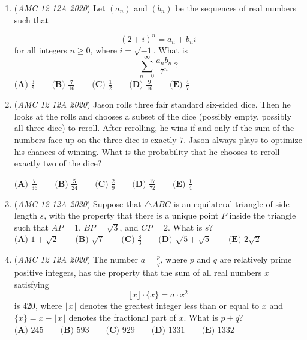 \begin{enumerate}
	\item (\textit{AMC 12 12A 2020}) Let $(a_n)$ and $(b_n)$ be the sequences of real numbers such that

 \[ (2 + i)^n = a_n + b_ni \]for all integers $n\geq 0$, where $i = \sqrt{-1}$. What is
 \[\sum_{n=0}^\infty\frac{a_nb_n}{7^n}\,?\]
$\textbf{(A) }\frac 38\qquad\textbf{(B) }\frac7{16}\qquad\textbf{(C) }\frac12\qquad\textbf{(D) }\frac9{16}\qquad\textbf{(E) }\frac47$


	\item (\textit{AMC 12 12A 2020}) Jason rolls three fair standard six-sided dice. Then he looks at the rolls and chooses a subset of the dice (possibly empty, possibly all three dice) to reroll. After rerolling, he wins if and only if the sum of the numbers face up on the three dice is exactly $7$. Jason always plays to optimize his chances of winning. What is the probability that he chooses to reroll exactly two of the dice?


 $\textbf{(A) } \frac{7}{36} \qquad\textbf{(B) } \frac{5}{24} \qquad\textbf{(C) } \frac{2}{9} \qquad\textbf{(D) } \frac{17}{72} \qquad\textbf{(E) } \frac{1}{4}$


	\item (\textit{AMC 12 12A 2020}) Suppose that $\triangle ABC$ is an equilateral triangle of side length $s$, with the property that there is a unique point $P$ inside the triangle such that $AP = 1$, $BP = \sqrt{3}$, and $CP = 2$. What is $s?$
$\textbf{(A) } 1 + \sqrt{2} \qquad \textbf{(B) } \sqrt{7} \qquad \textbf{(C) } \frac{8}{3} \qquad \textbf{(D) } \sqrt{5 + \sqrt{5}} \qquad \textbf{(E) } 2\sqrt{2}$


	\item (\textit{AMC 12 12A 2020}) The number $a = \frac{p}{q}$, where $p$ and $q$ are relatively prime positive integers, has the property that the sum of all real numbers $x$ satisfying
 \[\lfloor x \rfloor \cdot \{x\} = a \cdot x^2\]is $420$, where $\lfloor x \rfloor$ denotes the greatest integer less than or equal to $x$ and $\{x\} = x - \lfloor x \rfloor$ denotes the fractional part of $x$. What is $p + q?$
$\textbf{(A) } 245 \qquad \textbf{(B) } 593 \qquad \textbf{(C) } 929 \qquad \textbf{(D) } 1331 \qquad \textbf{(E) } 1332$


\end{enumerate}